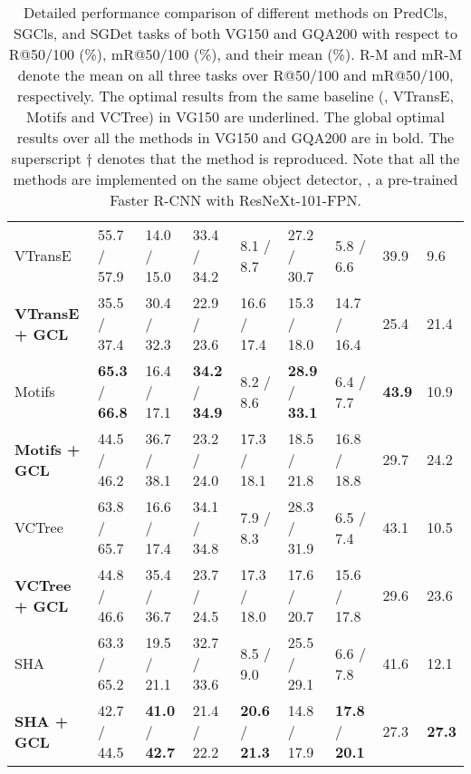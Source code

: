 \documentclass[10pt,twocolumn,letterpaper]{article}
\begin{document}
\begin{table*}[t]
\begin{tabular}{p{3.2cm}|p{1.4cm}<{\centering}p{1.4cm}<{\centering}|p{1.4cm}<{\centering}p{1.4cm}<{\centering}|p{1.4cm}<{\centering}p{1.4cm}<{\centering}|p{0.5cm}<{\centering}p{0.5cm}}
		VTransE & 55.7 / 57.9 & 14.0 / 15.0 & 33.4 / 34.2 & 8.1 / 8.7 & 27.2 / 30.7 & 5.8 / 6.6 & 39.9 & 9.6 \\ 
		\textbf{VTransE + GCL} & 35.5 / 37.4 & 30.4 / 32.3 & 22.9 / 23.6 & 16.6 / 17.4 & 15.3 / 18.0 & 14.7 / 16.4 & 25.4 & 21.4 \\
		\hline
		
		Motifs & \textbf{65.3} / \textbf{66.8} & 16.4 / 17.1 & \textbf{34.2} / \textbf{34.9} & 8.2 / 8.6 & \textbf{28.9} / \textbf{33.1} & 6.4 / 7.7 & \textbf{43.9} & 10.9 \\ 
		\textbf{Motifs + GCL} & 44.5 / 46.2 & 36.7 / 38.1 & 23.2 / 24.0 & 17.3 / 18.1 & 18.5 / 21.8 & 16.8 / 18.8 & 29.7 & 24.2 \\
		\hline
		
		VCTree & 63.8 / 65.7 & 16.6 / 17.4 & 34.1 / 34.8 & 7.9 / 8.3 & 28.3 / 31.9 & 6.5 / 7.4 & 43.1 & 10.5 \\
		\textbf{VCTree + GCL} & 44.8 / 46.6 & 35.4 / 36.7 & 23.7 / 24.5 & 17.3 / 18.0 & 17.6 / 20.7 & 15.6 / 17.8 & 29.6 & 23.6 \\
		 \hline
		 
		SHA & 63.3 / 65.2 & 19.5 / 21.1 & 32.7 / 33.6 & 8.5 / 9.0 & 25.5 / 29.1 & 6.6 / 7.8 & 41.6 & 12.1 \\
		\textbf{SHA + GCL} & 42.7 / 44.5 & \textbf{41.0} / \textbf{42.7} & 21.4 / 22.2 & \textbf{20.6} / \textbf{21.3} & 14.8 / 17.9 & \textbf{17.8} / \textbf{20.1} & 27.3 & \textbf{27.3} \\
		 \hline
		
		
	\end{tabular}
	\caption{Detailed performance comparison of different methods on PredCls, SGCls, and SGDet tasks of both VG150 and GQA200 with respect to R@50/100 (\%), mR@50/100 (\%), and their mean (\%). R-M and mR-M denote the mean on all three tasks over R@50/100 and mR@50/100, respectively. The optimal results from the same baseline (\ie, VTransE, Motifs and VCTree) in VG150 are underlined. The global optimal results over all the methods in VG150 and GQA200 are in bold. The superscript $\dag$ denotes that the method is reproduced. Note that all the methods are implemented on the same object detector, \ie, a pre-trained Faster R-CNN with ResNeXt-101-FPN.}
	\label{result_all}
\end{table*}
\end{document}
